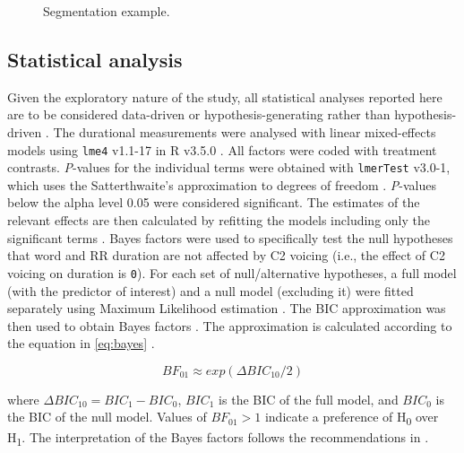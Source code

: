 \documentclass[preprint]{JASAnew}
\begin{document}
\begin{figure}
  \caption{Segmentation example.}
  \label{f:segmentation}
\end{figure}

\hypertarget{statistical-analysis}{%
\subsection{Statistical analysis}\label{statistical-analysis}}

Given the exploratory nature of the study, all statistical analyses
reported here are to be considered data-driven or hypothesis-generating
rather than hypothesis-driven \citep{kerr1998, gelman2013}. The
durational measurements were analysed with linear mixed-effects models
using \texttt{lme4} v1.1-17 in R v3.5.0
\citep{r-core-team2018, bates2015}. All factors were coded with
treatment contrasts. \emph{P}-values for the individual terms were
obtained with \texttt{lmerTest} v3.0-1, which uses the Satterthwaite's
approximation to degrees of freedom \citep{kuznetsova2017, luke2017}.
\emph{P}-values below the alpha level 0.05 were considered significant.
The estimates of the relevant effects are then calculated by refitting
the models including only the significant terms \citep[step-down
approach,][pp.~121--122]{diggle2002, zuur2009}. Bayes factors were used
to specifically test the null hypotheses that word and RR duration are
not affected by C2 voicing (i.e., the effect of C2 voicing on duration
is \texttt{0}). For each set of null/alternative hypotheses, a full
model (with the predictor of interest) and a null model (excluding it)
were fitted separately using Maximum Likelihood estimation
\citep[p.~34]{bates2015}. The BIC approximation was then used to obtain
Bayes factors
\citep{raftery1995, raftery1999, wagenmakers2007, jarosz2014}. The
approximation is calculated according to the equation in \ref{eq:bayes}
\citep[p.~796]{wagenmakers2007}.

\begin{equation}
\label{eq:bayes}
BF_{01} \approx exp(\Delta{}BIC_{10}/2)
\end{equation}

where \(\Delta{}BIC_{10} = BIC_1 - BIC_0\), \(BIC_1\) is the BIC of the
full model, and \(BIC_0\) is the BIC of the null model. Values of
\(BF_{01} > 1\) indicate a preference of H\textsubscript{0} over
H\textsubscript{1}. The interpretation of the Bayes factors follows the
recommendations in \citet[p.~139]{raftery1995}.
\end{document}
